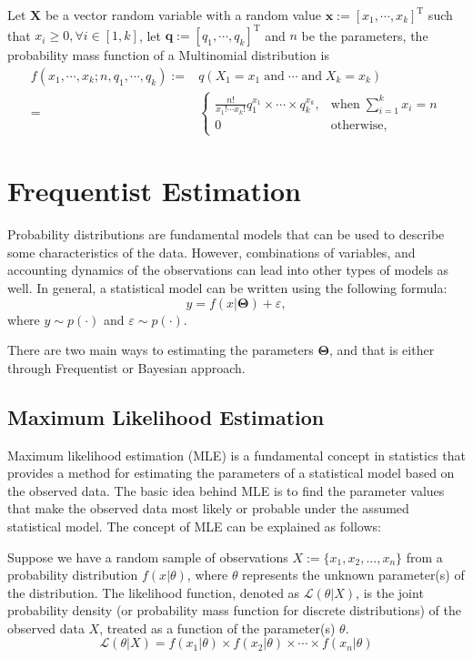 \begin{defn}
Let $\mathbf{X}$ be a vector random variable with a random value $\mathbf{x}:=[x_1,\cdots,x_k]^{\text{T}}$ such that $x_i\geq 0,\forall i \in[1,k]$, let $\boldsymbol{q}:=[q_1,\cdots,q_k]^{\text{T}}$ and $n$ be the parameters, the probability mass function of a Multinomial distribution is 
\begin{align}
    f(x_1,\cdots,x_k;n,q_1,\cdots,q_k):=& q(X_1=x_1\;\text{and}\;\cdots\;\text{and}\;X_k=x_k)\nonumber\\
    =&\begin{cases}
        \displaystyle\frac{n!}{x_1!\cdots x_k!}q_1^{x_1}\times\cdots\times q_k^{x_k},&\text{when}\;\sum_{i=1}^kx_i=n\\
        0&\text{otherwise},
    \end{cases}
\end{align}
\end{defn}

\section{Frequentist Estimation}\label{sec:stat_modeling}
Probability distributions are fundamental models that can be used to describe some characteristics of the data. However, combinations of variables, and accounting dynamics of the observations can lead into other types of models as well. In general, a statistical model can be written using the following formula:
\begin{equation}
    y=f(x|\mathbf{\Theta})+\varepsilon,
\end{equation}
where $y\sim p(\cdot)$ and $\varepsilon\sim p(\cdot)$.

There are two main ways to estimating the parameters $\boldsymbol{\Theta}$, and that is either through Frequentist or Bayesian approach.
\subsection{Maximum Likelihood Estimation}
Maximum likelihood estimation (MLE) is a fundamental concept in statistics that provides a method for estimating the parameters of a statistical model based on the observed data. The basic idea behind MLE is to find the parameter values that make the observed data most likely or probable under the assumed statistical model. The concept of MLE can be explained as follows:

Suppose we have a random sample of observations $X := \{x_1, x_2, ..., x_n\}$ from a probability distribution $f(x | \theta)$, where $\theta$ represents the unknown parameter(s) of the distribution. The likelihood function, denoted as $\mathcal{L}(\theta | X)$, is the joint probability density (or probability mass function for discrete distributions) of the observed data $X$, treated as a function of the parameter(s) $\theta$.
\begin{equation}
    \mathcal{L}(\theta | X) = f(x_1 | \theta) \times f(x_2 | \theta) \times\cdots\times f(x_n | \theta)    
\end{equation}

